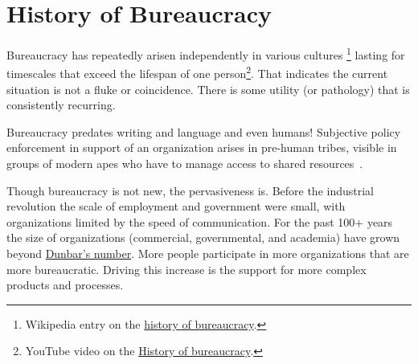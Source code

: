 \section{History of Bureaucracy\label{sec:history}}


Bureaucracy has repeatedly arisen independently in various cultures
\footnote{Wikipedia entry on the \href{https://en.wikipedia.org/wiki/Bureaucracy\%23History}{history of bureaucracy}.
}
lasting for timescales that exceed the lifespan of one person\footnote{YouTube video on the \href{https://www.youtube.com/watch?v=B_nsZlcC12g}{History of bureaucracy}.}. That indicates the current situation is not a fluke or coincidence. There is some utility (or pathology) that is consistently recurring. 


Bureaucracy predates writing and language and even humans! Subjective policy enforcement in support of an organization arises in pre-human tribes, visible in groups of modern apes who have to manage access to shared resources~\cite{2016_Suchak}. 



Though bureaucracy is not new, the pervasiveness is. Before the industrial revolution the scale of employment and government were small, with organizations limited by the speed of communication. For the past 100+ years the size of organizations (commercial, governmental, and academia) have grown beyond \href{https://en.wikipedia.org/wiki/Dunbar\%27s_number}{Dunbar's number}. 
More people participate in more organizations that are more bureaucratic. Driving this increase is the support for more complex products and processes. 



